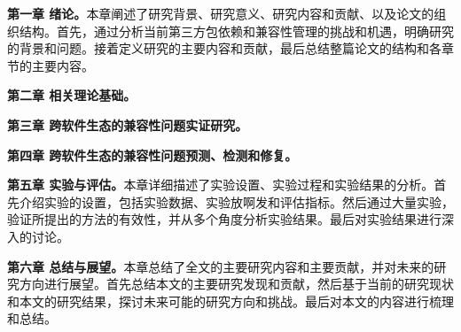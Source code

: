 \textbf{第一章 绪论。}本章阐述了研究背景、研究意义、研究内容和贡献、以及论文的组织结构。首先，通过分析当前第三方包依赖和兼容性管理的挑战和机遇，明确研究的背景和问题。接着定义研究的主要内容和贡献，最后总结整篇论文的结构和各章节的主要内容。

\textbf{第二章 相关理论基础。}

\textbf{第三章 跨软件生态的兼容性问题实证研究。}

\textbf{第四章 跨软件生态的兼容性问题预测、检测和修复。}

\textbf{第五章 实验与评估。}本章详细描述了实验设置、实验过程和实验结果的分析。首先介绍实验的设置，包括实验数据、实验放啊发和评估指标。然后通过大量实验，验证所提出的方法的有效性，并从多个角度分析实验结果。最后对实验结果进行深入的讨论。

\textbf{第六章 总结与展望。}本章总结了全文的主要研究内容和主要贡献，并对未来的研究方向进行展望。首先总结本文的主要研究发现和贡献，然后基于当前的研究现状和本文的研究结果，探讨未来可能的研究方向和挑战。最后对本文的内容进行梳理和总结。


